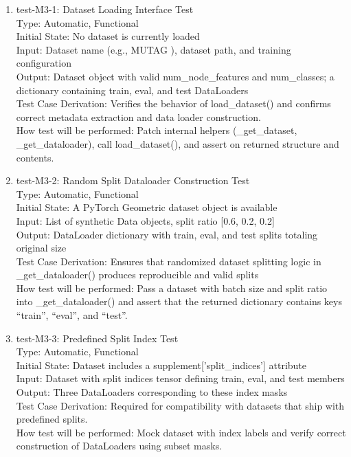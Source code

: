 \documentclass[12pt, titlepage]{article}
\begin{document}
\begin{enumerate}

\item{test-M3-1: Dataset Loading Interface Test\\}
Type: Automatic, Functional \\
Initial State: No dataset is currently loaded \\
Input: Dataset name (e.g., MUTAG \citep{debnath1991structure}), dataset path, and training configuration \\
Output: Dataset object with valid num\_node\_features and num\_classes; a dictionary containing train, eval, and test DataLoaders \\
Test Case Derivation: Verifies the behavior of load\_dataset() and confirms correct metadata extraction and data loader construction. \\
How test will be performed: Patch internal helpers (\_get\_dataset, \_get\_dataloader), call load\_dataset(), and assert on returned structure and contents.

\item{test-M3-2: Random Split Dataloader Construction Test\\}
Type: Automatic, Functional \\
Initial State: A PyTorch Geometric dataset object is available \\
Input: List of synthetic Data objects, split ratio [0.6, 0.2, 0.2] \\
Output: DataLoader dictionary with train, eval, and test splits totaling original size \\
Test Case Derivation: Ensures that randomized dataset splitting logic in \_get\_dataloader() produces reproducible and valid splits \\
How test will be performed: Pass a dataset with batch size and split ratio into \_get\_dataloader() and  assert that the returned dictionary contains keys ``train'', ``eval'', and ``test''. 


\item{test-M3-3: Predefined Split Index Test\\}
Type: Automatic, Functional \\
Initial State: Dataset includes a supplement['split\_indices'] attribute \\
Input: Dataset with split indices tensor defining train, eval, and test members \\
Output: Three DataLoaders corresponding to these index masks \\
Test Case Derivation: Required for compatibility with datasets that ship with predefined splits. \\
How test will be performed: Mock dataset with index labels and verify correct construction of DataLoaders using subset masks.


\end{enumerate}
\end{document}
